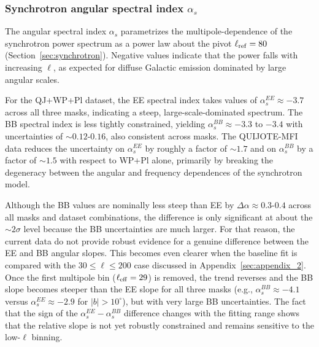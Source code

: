 \subsubsection{Synchrotron angular spectral index $\alpha_s$}
\label{sec:synch_alp_pl}

The angular spectral index $\alpha_s$ parametrizes the multipole-dependence of the synchrotron power spectrum as a power law about the pivot $\ell_{\rm ref} = 80$ (Section~\ref{sec:synchrotron}). Negative values indicate that the power falls with increasing $\ell$, as expected for diffuse Galactic emission dominated by large angular scales.

For the QJ+WP+Pl dataset, the EE spectral index takes values of $\alpha_s^{EE} \approx -3.7$ across all three masks, indicating a steep, large-scale-dominated spectrum. The BB spectral index is less tightly constrained, yielding $\alpha_s^{BB} \approx -3.3$ to $-3.4$ with uncertainties of $\sim 0.12\text{-}0.16$, also consistent across masks. The QUIJOTE-MFI data reduces the uncertainty on $\alpha_s^{EE}$ by roughly a factor of $\sim 1.7$ and on $\alpha_s^{BB}$ by a factor of $\sim 1.5$ with respect to WP+Pl alone, primarily by breaking the degeneracy between the angular and frequency dependences of the synchrotron model.

Although the BB values are nominally less steep than EE by $ \Delta \alpha \approx 0.3\text{-}0.4$ across all masks and dataset combinations, the difference is only significant at about the $\sim 2\sigma$ level because the BB uncertainties are much larger. For that reason, the current data do not provide robust evidence for a genuine difference between the EE and BB angular slopes. This becomes even clearer when the baseline fit is compared with the $30 \leq \ell \leq 200$ case discussed in Appendix~\ref{sec:appendix_2}. Once the first multipole bin ($\ell_{\rm eff} = 29$) is removed, the trend reverses and the BB slope becomes steeper than the EE slope for all three masks (e.g., $\alpha_s^{BB} \approx -4.1$ versus $\alpha_s^{EE} \approx -2.9$ for $|b| > 10^\circ$), but with very large BB uncertainties. The fact that the sign of the $\alpha_s^{EE} - \alpha_s^{BB}$ difference changes with the fitting range shows that the relative slope is not yet robustly constrained and remains sensitive to the low-$\ell$ binning.

